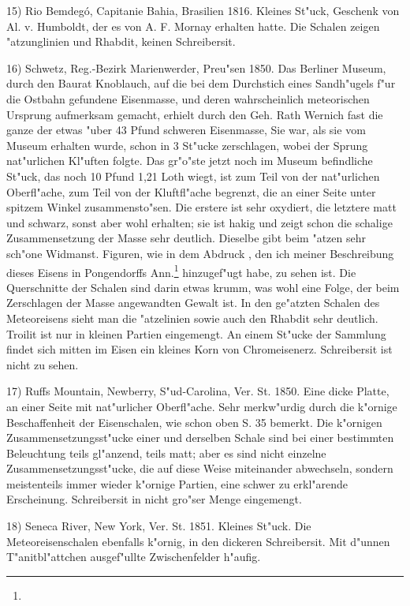 \documentclass[a4paper, 11pt, oneside]{article}
\begin{document}
15) Rio Bemdegó, Capitanie Bahia, Brasilien 1816. Kleines St"uck, Geschenk von Al. v. Humboldt, der es von A. F. Mornay erhalten hatte. Die Schalen zeigen "atzunglinien und Rhabdit, keinen Schreibersit.

16) Schwetz, Reg.-Bezirk Marienwerder, Preu"sen 1850. Das Berliner Museum, durch den Baurat Knoblauch, auf die bei dem Durchstich eines Sandh"ugels f"ur die Ostbahn gefundene Eisenmasse, und deren wahrscheinlich meteorischen Ursprung aufmerksam gemacht, erhielt durch den Geh. Rath Wernich fast die ganze der etwas "uber 43 Pfund schweren Eisenmasse, Sie war, als sie vom Museum erhalten wurde, schon in 3 St"ucke zerschlagen, wobei der Sprung nat"urlichen Kl"uften folgte. Das gr"o"ste jetzt noch im Museum befindliche St"uck, das noch 10 Pfund 1,21 Loth wiegt, ist zum Teil von der nat"urlichen Oberfl"ache, zum Teil von der Kluftfl"ache begrenzt, die an einer Seite unter spitzem Winkel zusammensto"sen. Die erstere ist sehr oxydiert, die letztere matt und schwarz, sonst aber wohl erhalten; sie ist hakig und zeigt schon die schalige Zusammensetzung der Masse sehr deutlich. Dieselbe gibt beim "atzen sehr sch"one Widmanst. Figuren, wie in dem Abdruck , den ich meiner Beschreibung dieses Eisens in Pongendorffs Ann.\footnote{} hinzugef"ugt habe, zu sehen ist. Die Querschnitte der Schalen sind darin etwas krumm, was wohl eine Folge, der beim Zerschlagen der Masse angewandten Gewalt ist. In den ge"atzten Schalen des Meteoreisens sieht man die "atzelinien sowie auch den Rhabdit sehr deutlich. Troilit ist nur in kleinen Partien eingemengt. An einem St"ucke der Sammlung findet sich mitten im Eisen ein kleines Korn von Chromeisenerz. Schreibersit ist nicht zu sehen.

17) Ruffs Mountain, Newberry, S"ud-Carolina, Ver. St. 1850. Eine dicke Platte, an einer Seite mit nat"urlicher Oberfl"ache. Sehr merkw"urdig durch die k"ornige Beschaffenheit der Eisenschalen, wie schon oben S. 35 bemerkt. Die k"ornigen Zusammensetzungsst"ucke einer und derselben Schale sind bei einer bestimmten Beleuchtung teils gl"anzend, teils matt; aber es sind nicht einzelne Zusammensetzungsst"ucke, die auf diese Weise miteinander abwechseln, sondern meistenteils immer wieder k"ornige Partien, eine schwer zu erkl"arende Erscheinung. Schreibersit in nicht gro"ser Menge eingemengt.

18) Seneca River, New York, Ver. St. 1851. Kleines St"uck. Die Meteoreisenschalen ebenfalls k"ornig, in den dickeren Schreibersit. Mit d"unnen T"anitbl"attchen ausgef"ullte Zwischenfelder h"aufig.
\end{document}

